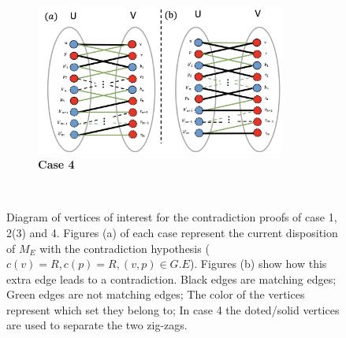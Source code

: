 \documentclass[10pt,a4paper]{article}
\begin{document}
\begin{figure}[h!]
\begin{subfigure}[t]{0.5\textwidth}
        \centering
        \includegraphics[width = 0.9\textwidth]{case_4}
        \caption*{\textbf{Case 4}}
    \end{subfigure}
    ~ 
    \caption{ Diagram of vertices of interest for the contradiction proofs of case 1, 2(3) and 4.  Figures (a) of each case represent the current disposition of $M_E$ with the contradiction hypothesis ($c(v) = R, c(p) = R, (v,p)\in G.E$). Figures (b) show how this extra edge leads to a contradiction. Black edges are matching edges; Green edges are not matching edges; The color of the vertices represent which set they belong to; In case 4 the doted/solid vertices are used to separate the two zig-zags. }
\end{figure} 
\end{document}
